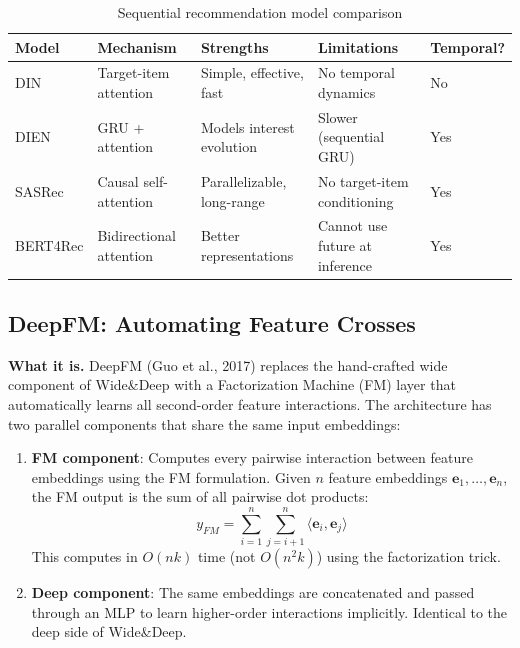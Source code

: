\begin{table}[H]
\centering
\caption{Sequential recommendation model comparison}
\begin{tabularx}{\textwidth}{lXXXl}
\toprule
\textbf{Model} & \textbf{Mechanism} & \textbf{Strengths} & \textbf{Limitations} & \textbf{Temporal?} \\
\midrule
DIN & Target-item attention & Simple, effective, fast & No temporal dynamics & No \\
DIEN & GRU + attention & Models interest evolution & Slower (sequential GRU) & Yes \\
SASRec & Causal self-attention & Parallelizable, long-range & No target-item conditioning & Yes \\
BERT4Rec & Bidirectional attention & Better representations & Cannot use future at inference & Yes \\
\bottomrule
\end{tabularx}
\end{table}

\subsection{DeepFM: Automating Feature Crosses}
\label{sec:deepfm}

\textbf{What it is.} DeepFM (Guo et al., 2017) replaces the hand-crafted wide component of Wide\&Deep with a Factorization Machine (FM) layer that automatically learns all second-order feature interactions. The architecture has two parallel components that share the same input embeddings:

\begin{enumerate}
    \item \textbf{FM component}: Computes every pairwise interaction between feature embeddings using the FM formulation. Given $n$ feature embeddings $\mathbf{e}_1, \ldots, \mathbf{e}_n$, the FM output is the sum of all pairwise dot products:
    \begin{equation}
    y_{FM} = \sum_{i=1}^{n}\sum_{j=i+1}^{n} \langle \mathbf{e}_i, \mathbf{e}_j \rangle
    \end{equation}
    This computes in $O(nk)$ time (not $O(n^2 k)$) using the factorization trick.

    \item \textbf{Deep component}: The same embeddings are concatenated and passed through an MLP to learn higher-order interactions implicitly. Identical to the deep side of Wide\&Deep.
\end{enumerate}

